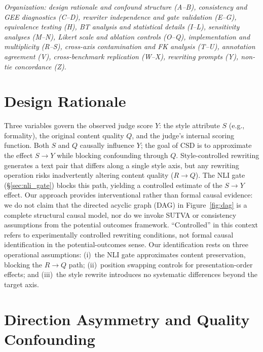\appendix

\noindent\emph{Organization: design rationale and confound structure (A--B), consistency and GEE diagnostics (C--D), rewriter independence and gate validation (E--G), equivalence testing (H), BT analysis and statistical details (I--L), sensitivity analyses (M--N), Likert scale and ablation controls (O--Q), implementation and multiplicity (R--S), cross-axis contamination and FK analysis (T--U), annotation agreement (V), cross-benchmark replication (W--X), rewriting prompts (Y), non-tie concordance (Z).}

\section{Design Rationale}
\label{app:design_rationale}

Three variables govern the observed judge score $Y$: the style attribute $S$ (e.g., formality), the original content quality $Q$, and the judge's internal scoring function.
Both $S$ and $Q$ causally influence $Y$; the goal of CSD is to approximate the effect $S \to Y$ while blocking confounding through $Q$.
Style-controlled rewriting generates a text pair that differs along a single style axis, but any rewriting operation risks inadvertently altering content quality ($R \to Q$).
The NLI gate (\S\ref{sec:nli_gate}) blocks this path, yielding a controlled estimate of the $S \to Y$ effect.
Our approach provides interventional rather than formal causal evidence: we do not claim that the directed acyclic graph (DAG) in Figure~\ref{fig:dag} is a complete structural causal model, nor do we invoke SUTVA or consistency assumptions from the potential outcomes framework.
``Controlled'' in this context refers to experimentally controlled rewriting conditions, not formal causal identification in the potential-outcomes sense.
Our identification rests on three operational assumptions: (i)~the NLI gate approximates content preservation, blocking the $R \to Q$ path; (ii)~position swapping controls for presentation-order effects; and (iii)~the style rewrite introduces no systematic differences beyond the target axis.

\section{Direction Asymmetry and Quality Confounding}
\label{app:direction}

